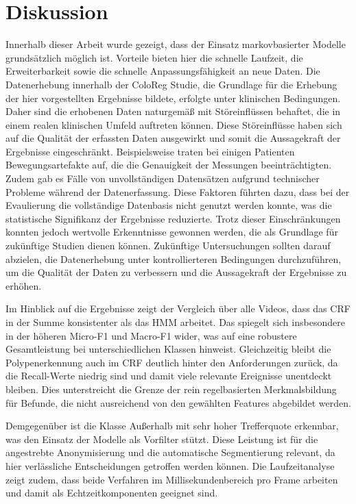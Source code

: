 \chapter{Diskussion}\label{ch:discussion}
Innerhalb dieser Arbeit wurde gezeigt, dass der Einsatz markovbasierter Modelle grundsätzlich möglich ist. Vorteile bieten hier die schnelle Laufzeit, die Erweiterbarkeit sowie die schnelle Anpassungsfähigkeit an neue Daten. Die Datenerhebung innerhalb der ColoReg Studie, die Grundlage für die Erhebung der hier vorgestellten Ergebnisse bildete, erfolgte unter klinischen Bedingungen.
Daher sind die erhobenen Daten naturgemäß mit Störeinflüssen behaftet, die in einem realen klinischen Umfeld auftreten können.
Diese Störeinflüsse haben sich auf die Qualität der erfassten Daten ausgewirkt und somit die Aussagekraft der Ergebnisse eingeschränkt.
Beispielsweise traten bei einigen Patienten Bewegungsartefakte auf, die die Genauigkeit der Messungen beeinträchtigten.
Zudem gab es Fälle von unvollständigen Datensätzen aufgrund technischer Probleme während der Datenerfassung.
Diese Faktoren führten dazu, dass bei der Evaulierung die vollständige Datenbasis nicht genutzt werden konnte, was die statistische Signifikanz der Ergebnisse reduzierte.
Trotz dieser Einschränkungen konnten jedoch wertvolle Erkenntnisse gewonnen werden, die als Grundlage für zukünftige Studien dienen können.
Zukünftige Untersuchungen sollten darauf abzielen, die Datenerhebung unter kontrollierteren Bedingungen durchzuführen, um die Qualität der Daten zu verbessern und die Aussagekraft der Ergebnisse zu erhöhen.

Im Hinblick auf die Ergebnisse zeigt der Vergleich über alle Videos, dass das CRF in der Summe konsistenter als das HMM arbeitet. Das spiegelt sich insbesondere in der höheren Micro-F1 und Macro-F1 wider, was auf eine robustere Gesamtleistung bei unterschiedlichen Klassen hinweist. Gleichzeitig bleibt die Polypenerkennung auch im CRF deutlich hinter den Anforderungen zurück, da die Recall-Werte niedrig sind und damit viele relevante Ereignisse unentdeckt bleiben. Dies unterstreicht die Grenze der rein regelbasierten Merkmalsbildung für Befunde, die nicht ausreichend von den gewählten Features abgebildet werden.

Demgegenüber ist die Klasse Außerhalb mit sehr hoher Trefferquote erkennbar, was den Einsatz der Modelle als Vorfilter stützt. Diese Leistung ist für die angestrebte Anonymisierung und die automatische Segmentierung relevant, da hier verlässliche Entscheidungen getroffen werden können. Die Laufzeitanalyse zeigt zudem, dass beide Verfahren im Millisekundenbereich pro Frame arbeiten und damit als Echtzeitkomponenten geeignet sind.

